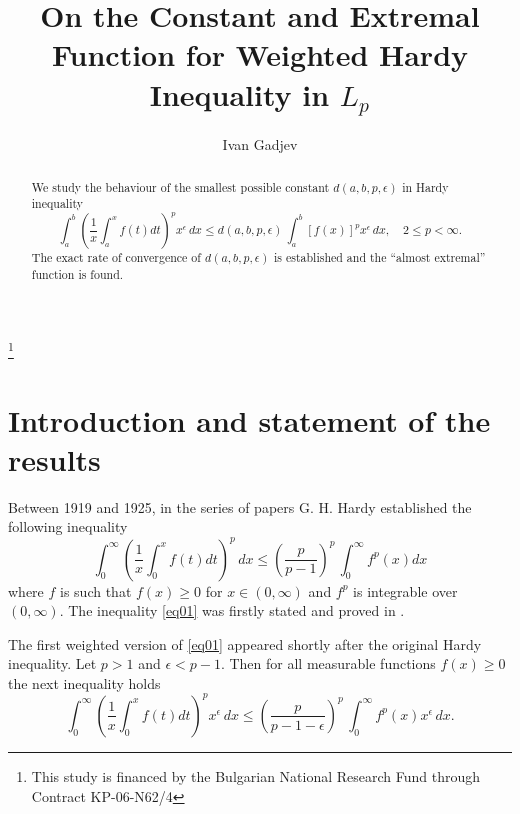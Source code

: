 \documentclass{amsart}
\theoremstyle{definition}
\theoremstyle{remark}
\numberwithin{equation}{section}
\begin{document}
\title[On the Constant and Extremal Function for Weighted Hardy Inequality in $L_p$]{On the Constant and Extremal Function for Weighted Hardy Inequality in $L_p$}
\thanks{This study is financed by the Bulgarian National Research Fund through Contract KP-06-N62/4}



\author[Ivan Gadjev]{Ivan Gadjev}
 \address{Department of Mathematics and Informatics,
Sofia University ``St. Kliment Ohridski'',
5 James Bourchier Blvd., 
1164 Sofia, Bulgaria}


      

\begin{abstract}
  We study the behaviour of the smallest possible constant $d(a,b, p,\epsilon)$    in Hardy inequality
$$
\int_a^b\left(\frac{1}{x}\int_a^xf(t)dt\right)^px^{\epsilon}\,dx\leq
d(a,b,p,\epsilon)\,\int_a^b [f(x)]^px^{\epsilon}\, dx, \quad 2\le p<\infty.
$$
The exact rate of convergence of $d(a,b,p,\epsilon)$ is established and 
the ``almost extremal'' function is found.
\end{abstract}

\maketitle

\section{Introduction and statement of the results}

Between 1919 and 1925, in the series of papers  \cite {H1919, H1920, H1925} G. H. Hardy established the following inequality
\begin{equation}\label{eq01}
\int_0^\infty\left(\frac{1}{x}\int_0^xf(t)dt\right)^p\,dx\leq
\left(\frac{p}{p-1}\right)^{p}\,\int_0^\infty f^p(x)dx
\end{equation}
where $f$ is such that $f(x)\geq0$ for $x\in (0,\infty)$ and $f^p$ is integrable over $(0,\infty)$. 
The inequality \eqref{eq01} was firstly stated and proved in \cite{H1925}.  

The first weighted version of \eqref{eq01} appeared shortly after the original Hardy inequality. Let $p>1$ and $\epsilon<p-1$. Then for all
measurable functions $f(x)\geq 0$ the next inequality holds
\begin{equation*}\label{I2}
\int_0^\infty\left(\frac{1}{x}\int_0^xf(t)dt\right)^px^\epsilon\,dx\leq
\left(\frac{p}{p-1-\epsilon}\right)^{p}\,\int_0^\infty f^p(x)x^\epsilon\, dx.
\end{equation*}
\end{document}
